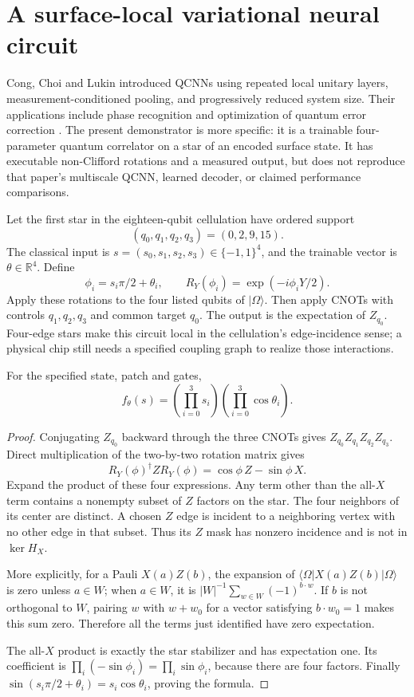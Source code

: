 \section{A surface-local variational neural circuit}

Cong, Choi and Lukin introduced QCNNs using repeated local unitary layers,
measurement-conditioned pooling, and progressively reduced system size.
Their applications include phase recognition and optimization of quantum
error correction \cite{QSCong2019}.  The present demonstrator is more
specific: it is a trainable four-parameter quantum correlator on a star
of an encoded surface state.  It has executable non-Clifford rotations
and a measured output, but does not reproduce that paper's multiscale
QCNN, learned decoder, or claimed performance comparisons.

Let the first star in the eighteen-qubit cellulation have ordered support
\[
 (q_0,q_1,q_2,q_3)=(0,2,9,15).
\]
The classical input is $s=(s_0,s_1,s_2,s_3)\in\{-1,1\}^4$, and the
trainable vector is $\theta\in\mathbb R^4$.  Define
\[
 \phi_i=s_i\pi/2+\theta_i,\qquad
 R_Y(\phi_i)=\exp(-i\phi_iY/2).
\]
Apply these rotations to the four listed qubits of $|\Omega\rangle$.
Then apply CNOTs with controls $q_1,q_2,q_3$ and common target $q_0$.
The output is the expectation of $Z_{q_0}$.  Four-edge stars make this
circuit local in the cellulation's edge-incidence sense; a physical chip
still needs a specified coupling graph to realize those interactions.

\begin{theorem}
For the specified state, patch and gates,
\begin{equation}
 f_\theta(s)=\left(\prod_{i=0}^3s_i\right)
              \left(\prod_{i=0}^3\cos\theta_i\right).
 \label{eq:qnn-exact-output}
\end{equation}
\end{theorem}
\begin{proof}
Conjugating $Z_{q_0}$ backward through the three CNOTs gives
$Z_{q_0}Z_{q_1}Z_{q_2}Z_{q_3}$.  Direct multiplication of the
two-by-two rotation matrix gives
\[
 R_Y(\phi)^\dagger ZR_Y(\phi)=\cos\phi\,Z-\sin\phi\,X.
\]
Expand the product of these four expressions.  Any term other than the
all-$X$ term contains a nonempty subset of $Z$ factors on the star.
The four neighbors of its center are distinct.  A chosen $Z$ edge is
incident to a neighboring vertex with no other edge in that subset.
Thus its $Z$ mask has nonzero incidence and is not in $\ker H_X$.

More explicitly, for a Pauli $X(a)Z(b)$, the expansion of
$\langle\Omega|X(a)Z(b)|\Omega\rangle$ is zero unless $a\in W$;
when $a\in W$, it is $|W|^{-1}\sum_{w\in W}(-1)^{b\cdot w}$.
If $b$ is not orthogonal to $W$, pairing $w$ with $w+w_0$ for a
vector satisfying $b\cdot w_0=1$ makes this sum zero.  Therefore all
the terms just identified have zero expectation.

The all-$X$ product is exactly the star stabilizer and has expectation
one.  Its coefficient is $\prod_i(-\sin\phi_i)=\prod_i\sin\phi_i$,
because there are four factors.  Finally
$\sin(s_i\pi/2+\theta_i)=s_i\cos\theta_i$, proving the formula.
\end{proof}

